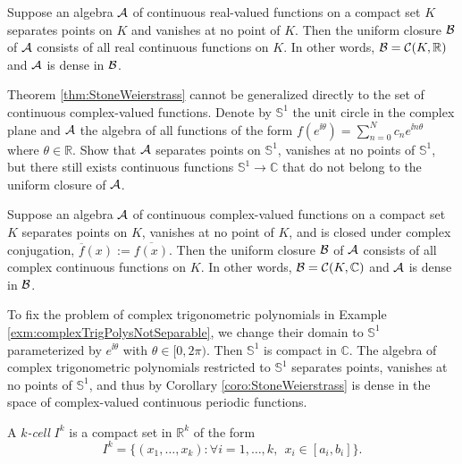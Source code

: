\begin{thm}
  \label{thm:StoneWeierstrass}
  Suppose an algebra ${\cal A}$ of continuous real-valued functions
  on a compact set $K$
  separates points on $K$ and vanishes at no point of $K$.
  Then the uniform closure ${\cal B}$ of ${\cal A}$
  consists of all real continuous functions on $K$. 
  In other words, ${\cal B}={\cal C}(K, \mathbb{R})$
  and ${\cal A}$ is dense in ${\cal B}$.
\end{thm}

\begin{exc}
  Theorem \ref{thm:StoneWeierstrass}
  cannot be generalized directly to
  the set of continuous complex-valued functions.
  Denote by $\mathbb{S}^1$ the unit circle in the complex plane
  and ${\cal A}$ the algebra of all functions of the form
  $f(e^{\ii \theta}) = \sum_{n=0}^N c_n e^{\ii n\theta}$
  where $\theta\in \mathbb{R}$.
  Show that ${\cal A}$ separates points on $\mathbb{S}^1$,
  vanishes at no points of $\mathbb{S}^1$,
  but there still exists continuous functions
  $\mathbb{S}^1\rightarrow \mathbb{C}$
  that do not belong to the uniform closure of ${\cal A}$. 
\end{exc}

\begin{coro}
  \label{coro:StoneWeierstrass}
  Suppose an algebra ${\cal A}$ of continuous complex-valued functions
  on a compact set $K$
  separates points on $K$, vanishes at no point of $K$, 
  and is closed under complex conjugation, %
  $\overline{f}(x):=\overline{f(x)}$. 
  Then the uniform closure ${\cal B}$ of ${\cal A}$
  consists of all complex continuous functions on $K$.
  In other words,
  ${\cal B}={\cal C}(K, \mathbb{C})$
  and ${\cal A}$ is dense in ${\cal B}$.
\end{coro}

\begin{exm}
  To fix the problem of complex trigonometric polynomials
  in Example \ref{exm:complexTrigPolysNotSeparable},
  we change their domain to $\mathbb{S}^1$
  parameterized by $e^{\ii \theta}$ with $\theta\in[0,2\pi)$.
  Then $\mathbb{S}^1$ is compact in $\mathbb{C}$. 
  The algebra of complex trigonometric polynomials
  restricted to $\mathbb{S}^1$ separates points, 
  vanishes at no points of $\mathbb{S}^1$,
  and thus by Corollary \ref{coro:StoneWeierstrass}
  is dense in the space of complex-valued continuous periodic functions.
\end{exm}

\begin{defn}
  \label{def:kCell}
  A \emph{$k$-cell} $I^k$ is a compact set in $\mathbb{R}^k$
  of the form
  \begin{equation}
    \label{eq:kCell}
    I^k = \{(x_1,\ldots, x_k): \forall i=1,\ldots,k,\ \ 
    x_i\in[a_i, b_i]\}. 
  \end{equation}
\end{defn}

